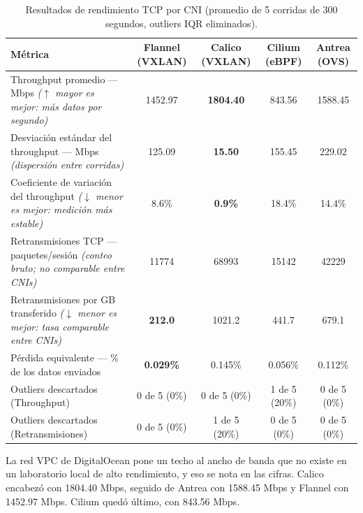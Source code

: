 \begin{table}[htbp]
\centering
\scriptsize
\caption{Resultados de rendimiento TCP por CNI (promedio de 5 corridas de 300 segundos, outliers IQR eliminados).}
\label{tab:throughput-resultados}
\begin{tabularx}{\textwidth}{|Y|c|c|c|c|}
\hline
\textbf{Métrica} & \textbf{Flannel (VXLAN)} & \textbf{Calico (VXLAN)} & \textbf{Cilium (eBPF)} & \textbf{Antrea (OVS)} \\
\hline
Throughput promedio --- Mbps \newline\textit{($\uparrow$ mayor es mejor: más datos por segundo)} & 1452.97 & \textbf{1804.40} & 843.56 & 1588.45 \\
\hline
Desviación estándar del throughput --- Mbps \newline\textit{(dispersión entre corridas)} & 125.09 & \textbf{15.50} & 155.45 & 229.02 \\
\hline
Coeficiente de variación del throughput \newline\textit{($\downarrow$ menor es mejor: medición más estable)} & 8.6\% & \textbf{0.9\%} & 18.4\% & 14.4\% \\
\hline
Retransmisiones TCP --- paquetes/sesión \newline\textit{(conteo bruto; no comparable entre CNIs)} & 11774 & 68993 & 15142 & 42229 \\
\hline
Retransmisiones por GB transferido \newline\textit{($\downarrow$ menor es mejor: tasa comparable entre CNIs)} & \textbf{212.0} & 1021.2 & 441.7 & 679.1 \\
\hline
Pérdida equivalente --- \% de los datos enviados & \textbf{0.029\%} & 0.145\% & 0.056\% & 0.112\% \\
\hline
Outliers descartados (Throughput) & 0 de 5 (0\%) & 0 de 5 (0\%) & 1 de 5 (20\%) & 0 de 5 (0\%) \\
\hline
Outliers descartados (Retransmisiones) & 0 de 5 (0\%) & 1 de 5 (20\%) & 0 de 5 (0\%) & 0 de 5 (0\%) \\
\hline
\end{tabularx}
\end{table}

La red VPC de DigitalOcean pone un techo al ancho de banda que no existe en un laboratorio local de alto rendimiento, y eso se nota en las cifras. Calico encabezó con 1804.40 Mbps, seguido de Antrea con 1588.45 Mbps y Flannel con 1452.97 Mbps. Cilium quedó último, con 843.56 Mbps.

